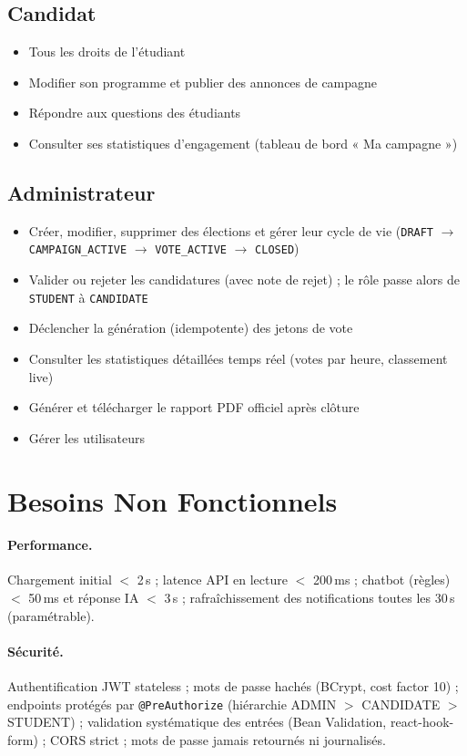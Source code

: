 \documentclass[12pt,a4paper]{report}
\begin{document}
\subsection{Candidat}
\begin{itemize}
  \item Tous les droits de l'étudiant
  \item Modifier son programme et publier des annonces de campagne
  \item Répondre aux questions des étudiants
  \item Consulter ses statistiques d'engagement (tableau de bord « Ma campagne »)
\end{itemize}

\subsection{Administrateur}
\begin{itemize}
  \item Créer, modifier, supprimer des élections et gérer leur cycle de vie (\texttt{DRAFT} $\rightarrow$ \texttt{CAMPAIGN\_ACTIVE} $\rightarrow$ \texttt{VOTE\_ACTIVE} $\rightarrow$ \texttt{CLOSED})
  \item Valider ou rejeter les candidatures (avec note de rejet) ; le rôle passe alors de \texttt{STUDENT} à \texttt{CANDIDATE}
  \item Déclencher la génération (idempotente) des jetons de vote
  \item Consulter les statistiques détaillées temps réel (votes par heure, classement live)
  \item Générer et télécharger le rapport PDF officiel après clôture
  \item Gérer les utilisateurs
\end{itemize}

\section{Besoins Non Fonctionnels}

\paragraph{Performance.} Chargement initial $<$ 2\,s ; latence API en lecture $<$ 200\,ms ; chatbot (règles) $<$ 50\,ms et réponse IA $<$ 3\,s ; rafraîchissement des notifications toutes les 30\,s (paramétrable).

\paragraph{Sécurité.} Authentification JWT stateless ; mots de passe hachés (BCrypt, cost factor 10) ; endpoints protégés par \texttt{@PreAuthorize} (hiérarchie ADMIN $>$ CANDIDATE $>$ STUDENT) ; validation systématique des entrées (Bean Validation, react-hook-form) ; CORS strict ; mots de passe jamais retournés ni journalisés.
\end{document}
